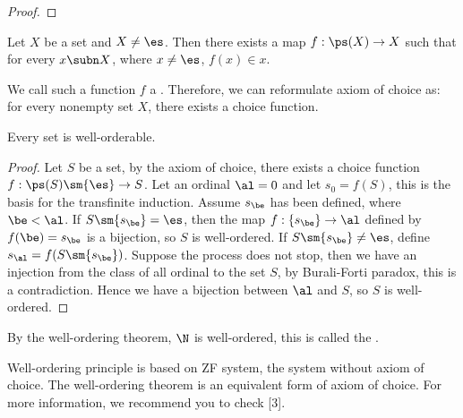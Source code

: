 \documentclass[10pt]{article}
\begin{document}
\begin{proof}
    
\end{proof}
\begin{Axiom of choice}
    Let $X$ be a set and $X\ne\es$. Then there exists a map $f:\ps(X)\to X$ such that for every $x\subn X$, where $x\ne\es$, $f(x)\in x$. 
\end{Axiom of choice}
\par
We call such a function $f$ a . Therefore, we can reformulate axiom of choice as: for every nonempty set $X$, there exists a choice function.
\begin{theorem}
    Every set is well-orderable.
\end{theorem}
\begin{proof}
    Let $S$ be a set, by the axiom of choice, there exists a choice function $f:\ps(S)\sm\{\es\}\to S$. Let an ordinal $\al=0$ and let ${s}_{0}=f(S)$, this is the basis for the transfinite induction. Assume ${s}_{\be}$ has been defined, where $\be<\al$. If $S\sm\{{s}_{\be}\}=\es$, then the map $f:\{{s}_{\be}\}\to\al$ defined by $f(\be)={s}_{\be}$ is a bijection, so $S$ is well-ordered. If $S\sm\{{s}_{\be}\}\ne\es$, define ${s}_{\al}=f(S\sm\{{s}_{\be}\})$. Suppose the process does not stop, then we have an injection from the class of all ordinal to the set $S$, by Burali-Forti paradox, this is a contradiction. Hence we have a bijection between $\al$ and $S$, so $S$ is well-ordered.
\end{proof}
\par
By the well-ordering theorem, $\N$ is well-ordered, this is called the .
\begin{remark}
    Well-ordering principle is based on ZF system, the system without axiom of choice. The well-ordering theorem is an equivalent form of axiom of choice. For more information, we recommend you to check [3].
\end{remark}
\end{document}
